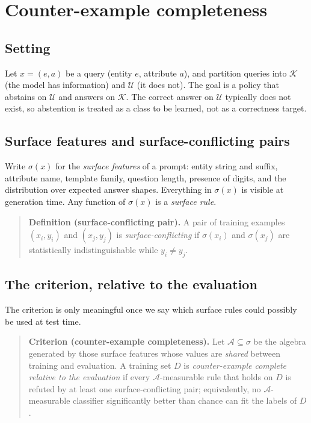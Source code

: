 \documentclass[11pt,a4paper]{article}
\begin{document}
\section{Counter-example completeness}
\label{sec:iso}

\subsection{Setting}

Let $x=(e,a)$ be a query (entity $e$, attribute $a$), and partition queries
into $\mathcal{K}$ (the model has information) and $\mathcal{U}$ (it does not).
The goal is a policy that abstains on $\mathcal{U}$ and answers on
$\mathcal{K}$. The correct answer on $\mathcal{U}$ typically does not exist, so
abstention is treated as a class to be learned, not as a correctness target.

\subsection{Surface features and surface-conflicting pairs}

Write $\sigma(x)$ for the \emph{surface features} of a prompt: entity string
and suffix, attribute name, template family, question length, presence of
digits, and the distribution over expected answer shapes. Everything in
$\sigma(x)$ is visible at generation time. Any function of $\sigma(x)$ is a
\emph{surface rule}.

\begin{quote}
\textbf{Definition (surface-conflicting pair).} A pair of training examples
$(x_i,y_i)$ and $(x_j,y_j)$ is \emph{surface-conflicting} if $\sigma(x_i)$ and
$\sigma(x_j)$ are statistically indistinguishable while $y_i\neq y_j$.
\end{quote}

\subsection{The criterion, relative to the evaluation}

The criterion is only meaningful once we say which surface rules could possibly
be used at test time.

\begin{quote}
\textbf{Criterion (counter-example completeness).} Let $\mathcal A\subseteq
\sigma$ be the algebra generated by those surface features whose values are
\emph{shared} between training and evaluation. A training set $D$ is
\emph{counter-example complete relative to the evaluation} if every
$\mathcal A$-measurable rule that holds on $D$ is refuted by at least one
surface-conflicting pair; equivalently, no $\mathcal A$-measurable classifier
significantly better than chance can fit the labels of $D$.
\end{quote}
\end{document}

